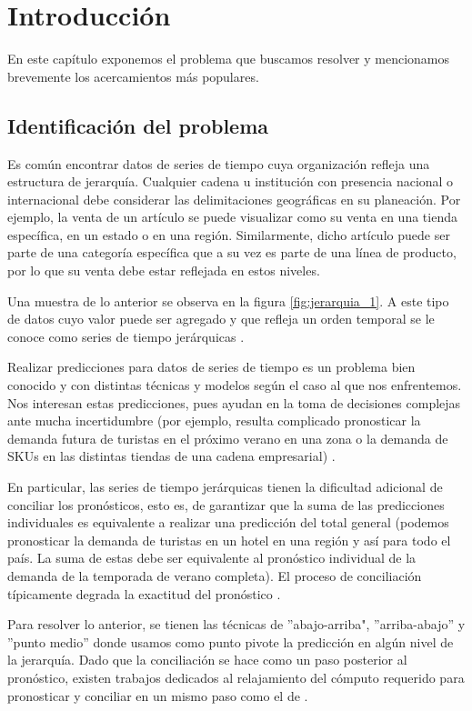 \chapter{Introducción}

En este capítulo exponemos el problema que buscamos resolver y mencionamos brevemente los acercamientos más populares.

\section{Identificación del problema}
Es común encontrar datos de series de tiempo cuya organización refleja una estructura de jerarquía. Cualquier cadena u institución con presencia nacional o internacional debe considerar las delimitaciones geográficas en su planeación. Por ejemplo, la venta de un artículo se puede visualizar como su venta en una tienda específica, en un estado o en una región. Similarmente, dicho artículo puede ser parte de una categoría específica que a su vez es parte de una línea de producto, por lo que su venta debe estar reflejada en estos niveles. 

Una muestra de lo anterior se observa en la figura \ref{fig:jerarquia_1}. A este tipo de datos cuyo valor puede ser agregado y que refleja un orden temporal se le conoce como series de tiempo jerárquicas \cite{hyndman2018forecasting}.

Realizar predicciones para datos de series de tiempo es un problema bien conocido y con distintas técnicas y modelos según el caso al que nos enfrentemos. Nos interesan estas predicciones, pues ayudan en la toma de decisiones complejas ante mucha incertidumbre (por ejemplo, resulta complicado pronosticar la demanda futura de turistas en el próximo verano en una zona o la demanda de SKUs en las distintas tiendas de una cadena empresarial) \cite{abolghasemi2020model}.

En particular, las series de tiempo jerárquicas tienen la dificultad adicional de conciliar los pronósticos, esto es, de garantizar que la suma de las predicciones individuales es equivalente a realizar una predicción del total general (podemos pronosticar la demanda de turistas en un hotel en una región y así para todo el país. La suma de estas debe ser equivalente al pronóstico individual de la demanda de la temporada de verano completa). El proceso de conciliación típicamente degrada la exactitud del pronóstico \cite{hyndman2014optimally}.  

Para resolver lo anterior, se tienen las técnicas de ''abajo-arriba", ''arriba-abajo'' y ''punto medio'' donde usamos como punto pivote la predicción en algún nivel de la jerarquía. Dado que la conciliación se hace como un paso posterior al pronóstico, existen trabajos dedicados al relajamiento del cómputo requerido para pronosticar y conciliar en un mismo paso como el de \cite{ashouri2019fast}.

